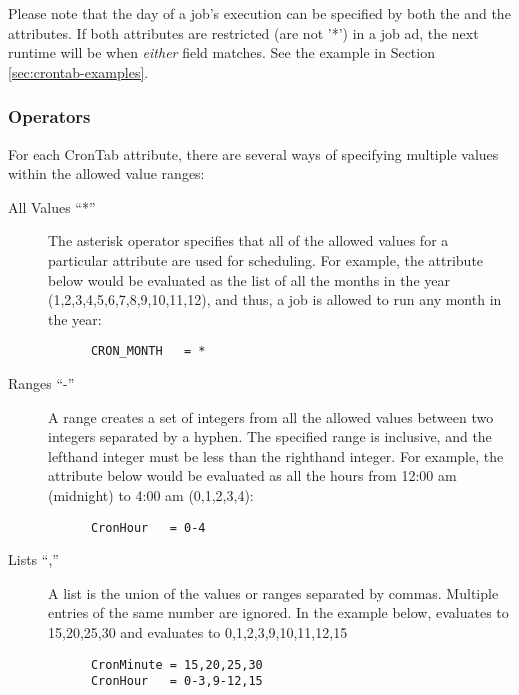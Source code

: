 Please note that the day of a job's execution can be specified by both the  and the  attributes. If both attributes are restricted (are not '*') in a job ad, the next runtime will be when \emph{either} field matches. See the example in Section \ref{sec:crontab-examples}.

\subsubsection{Operators}
\label{sec:crontab-operators}
For each CronTab attribute, there are several ways of specifying multiple values within the allowed value ranges:

\begin{description}
   \item[All Values ``*'']
   The asterisk operator specifies that all of the allowed values for a
   particular attribute are used for scheduling. For example, the 
    attribute below would be evaluated as the list of
   all the months in the year (1,2,3,4,5,6,7,8,9,10,11,12), and thus, a job
   is allowed to run any month in the year:
   
   \begin{verbatim}
      CRON_MONTH   = *
   \end{verbatim}

   \item[Ranges ``-'']
   A range creates a set of integers from all the allowed values between two
   integers separated by a hyphen. The specified range is inclusive, and the
   lefthand integer must be less than the righthand integer. For example,
   the  attribute below would be evaluated as all the
   hours from 12:00 am (midnight) to 4:00 am (0,1,2,3,4):
   
   \begin{verbatim}
      CronHour   = 0-4
   \end{verbatim}
   
   \item[Lists ``,'']
   A list is the union of the values or ranges separated by commas. Multiple
   entries of the same number are ignored. In the example below,
    evaluates to 15,20,25,30 and 
   evaluates to 0,1,2,3,9,10,11,12,15
   
   \begin{verbatim}
      CronMinute = 15,20,25,30
      CronHour   = 0-3,9-12,15
   \end{verbatim}
      

\end{description}
